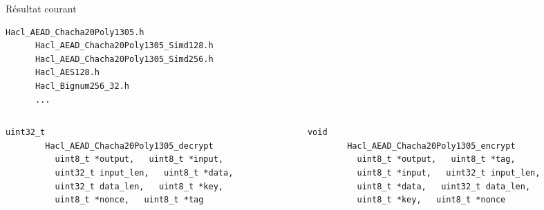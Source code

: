 \documentclass[A4,svgnames,9pt,aspectratio=169]{beamer}
\begin{document}

\begin{frame}[fragile]{Résultat courant}

  \begin{center}
    \begin{lstlisting}[style=global, caption={liste}, gobble=6]
      Hacl_AEAD_Chacha20Poly1305.h
      Hacl_AEAD_Chacha20Poly1305_Simd128.h
      Hacl_AEAD_Chacha20Poly1305_Simd256.h
      Hacl_AES128.h
      Hacl_Bignum256_32.h
      ...
    \end{lstlisting}
  \end{center}
  \begin{columns}
  
    \begin{column}{0.5\textwidth}
        \begin{lstlisting}[style=global, caption={Hacl\_AEAD\_Chacha20Poly1305-Hacl\_AEAD\_Chacha20Poly1305\_decrypt}, gobble=8]
        uint32_t
        Hacl_AEAD_Chacha20Poly1305_decrypt
          uint8_t *output,   uint8_t *input,
          uint32_t input_len,   uint8_t *data,
          uint32_t data_len,   uint8_t *key,
          uint8_t *nonce,   uint8_t *tag
      \end{lstlisting}
      
    \end{column}

    \begin{column}{0.5\textwidth}
        \begin{lstlisting}[style=global, caption={Hacl\_AEAD\_Chacha20Poly1305-Hacl\_AEAD\_Chacha20Poly1305\_encrypt}, gobble=8]
        void
        Hacl_AEAD_Chacha20Poly1305_encrypt
          uint8_t *output,   uint8_t *tag,
          uint8_t *input,   uint32_t input_len,
          uint8_t *data,   uint32_t data_len,
          uint8_t *key,   uint8_t *nonce
      \end{lstlisting}
      
    \end{column}

  \end{columns}

\end{frame}

\end{document}
